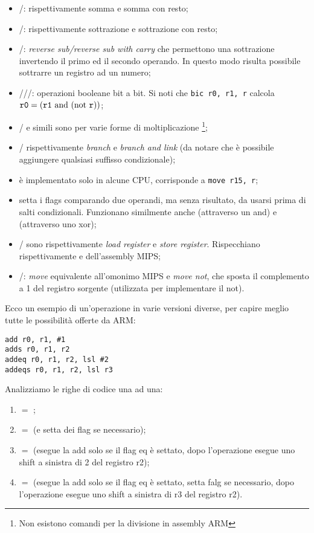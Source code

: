 \documentclass[class=book, crop=false, oneside]{standalone}
\begin{document}
\begin{itemize}
	\item {}/: rispettivamente somma e somma con resto;
	\item {}/: rispettivamente sottrazione e sottrazione con resto;
	\item {}/: \emph{reverse sub/reverse sub with carry} che permettono una sottrazione invertendo il primo ed il secondo operando. In questo modo risulta possibile sottrarre un registro ad un numero;
	\item {}///: operazioni booleane bit a bit. Si noti che \texttt{bic r0, r1, r} calcola \(\texttt{r0} = (\texttt{r1} \textrm{ and } (\textrm{not } \texttt{r}))\);
	\item {}/ e simili sono per varie forme di moltiplicazione \footnote{Non esistono comandi per la divisione in assembly ARM};
	\item {}/ rispettivamente \emph{branch} e \emph{branch and link} (da notare che è possibile aggiungere qualsiasi suffisso condizionale);
	\item {} è implementato solo in alcune CPU, corrisponde a \texttt{move r15, r};
	\item {} setta i flags comparando due operandi, ma senza risultato, da usarsi prima di salti condizionali. Funzionano similmente anche  (attraverso un and) e  (attraverso uno xor);
	\item {}/ sono rispettivamente \emph{load register} e \emph{store register}. Rispecchiano rispettivamente  e  dell'assembly MIPS;
	\item {}/: \emph{move} equivalente all'omonimo MIPS e \emph{move not}, che sposta il complemento a 1 del registro sorgente (utilizzata per implementare il not).
\end{itemize}
Ecco un esempio di un'operazione in varie versioni diverse, per capire meglio tutte le possibilità offerte da ARM:
\begin{verbatim}
add r0, r1, #1
adds r0, r1, r2
addeq r0, r1, r2, lsl #2
addeqs r0, r1, r2, lsl r3
\end{verbatim}
Analizziamo le righe di codice una ad una:
\begin{enumerate}
	\item {} \(=\) ;
	\item {} \(=\)  (e setta dei flag se necessario);
	\item {} \(=\)  (esegue la add solo se il flag eq è settato, dopo l'operazione esegue uno shift a sinistra di 2 del registro r2);
	\item {} \(=\)  (esegue la add solo se il flag eq è settato, setta falg se necessario, dopo l'operazione esegue uno shift a sinistra di r3 del registro r2).
\end{enumerate}
\end{document}
